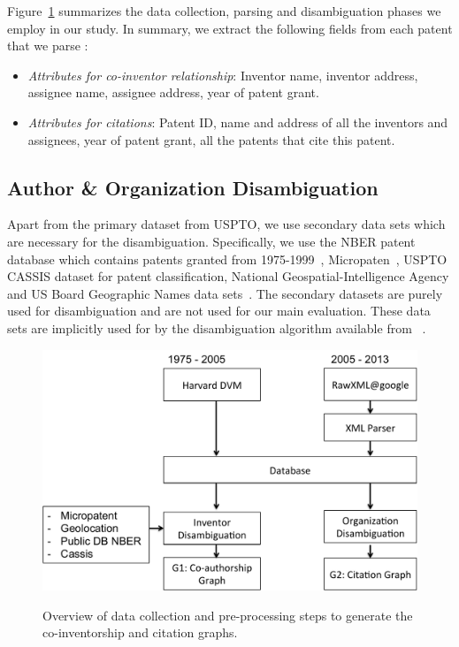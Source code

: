 Figure~\ref{process} summarizes the data collection, parsing and disambiguation phases we employ in our study.
In summary, we extract the following fields from each patent that we parse :

\begin{itemize}
\squish
\item {\em Attributes for co-inventor relationship}:
Inventor name, inventor address, assignee name, assignee address, year of patent grant.

\item {\em Attributes for citations}:
Patent ID, name and address of all the inventors and assignees, year of patent grant, all the patents that cite this patent.
\end{itemize}


\subsection{Author \& Organization Disambiguation}

Apart from the primary dataset from USPTO, we use secondary data sets which are necessary for the disambiguation. Specifically, we use the NBER patent database which contains patents granted from 1975-1999~\cite{NBER}, Micropaten~\cite{micropatent}, USPTO CASSIS dataset for patent classification, National Geospatial-Intelligence Agency and US Board Geographic Names data sets~\cite{geocoding, geotable}. The secondary datasets are purely used for disambiguation and are not used for our main evaluation. These data sets are implicitly used for by the disambiguation algorithm available from ~\cite{disambiguation}.

\begin{figure}[H]
		  \centering	
          \includegraphics[scale=0.4]{../figures/process.pdf}
          \label{process}
          \caption{Overview of data collection and pre-processing steps to generate the co-inventorship and citation graphs.}
\end{figure}


